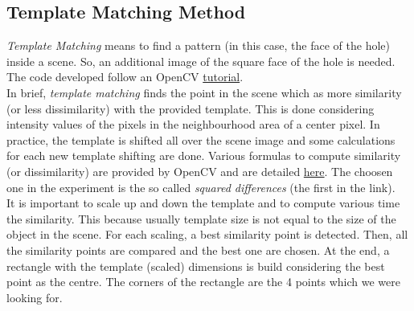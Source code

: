 \subsection{Template Matching Method}
\label{subsec:templateMatch}
\textit{Template Matching} means to find a pattern (in this case, the face of the hole) inside a scene. So, an additional image of the square face of the hole is needed.\\
The code developed follow an OpenCV \href{https://docs.opencv.org/3.4.6/de/da9/tutorial_template_matching.html}{tutorial}.\\
In brief, \textit{template matching} finds the point in the scene which as more similarity (or less dissimilarity) with the provided template. This is done considering intensity values of the pixels in the neighbourhood area of a center pixel. In practice, the template is shifted all over the scene image and some calculations for each new template shifting are done. Various formulas to compute similarity (or dissimilarity) are provided by OpenCV and are detailed \href{https://docs.opencv.org/master/df/dfb/group__imgproc__object.html#gga3a7850640f1fe1f58fe91a2d7583695dab65c042ed62c9e9e095a1e7e41fe2773}{here}. The choosen one in the experiment is the so called \textit{squared differences} (the first in the link).\\
It is important to scale up and down the template and to compute various time the similarity. This because usually template size is not equal to the size of the object in the scene. For each scaling, a best similarity point is detected. Then, all the similarity points are compared and the best one are chosen.  At the end, a rectangle with the template (scaled) dimensions is build considering the best point as the centre. The corners of the rectangle are the 4 points which we were looking for.

